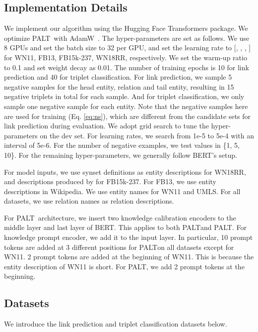 \documentclass[11pt]{article}
\newcommand{\method}{\textsc{PALT}}
\newcommand{\methodLarge}{\method}
\newcommand{\prompt}{knowledge prompt encoder}
\newcommand{\calibration}{knowledge calibration encoder}
\begin{document}
\subsection{Implementation Details}
We implement our algorithm using the Hugging Face Transformers package. We optimize \method\ with AdamW~\cite{loshchilov_decoupled_2018}. The hyper-parameters are set as follows. We use 8 GPUs and set the batch size to 32 per GPU, and set the learning rate to [, , , ] for WN11, FB13, FB15k-237, WN18RR, respectively. We set the warm-up ratio to 0.1 and set weight decay as 0.01. The number of training epochs is 10 for link prediction and 40 for triplet classification. For link prediction, we sample 5 negative samples for the head entity, relation and tail entity, resulting in 15 negative triplets in total for each sample. And for triplet classification, we only sample one negative sample for each entity. Note that the negative samples here are used for training (Eq. \ref{eq:ns}), which are different from the candidate sets for link prediction during evaluation. 
We adopt grid search to tune the hyper-parameters on the dev set. For learning rates, we search from 1e-5 to 5e-4 with an interval of 5e-6. For the number of negative examples, we test values in \{1, 5, 10\}. For the remaining hyper-parameters, we generally follow BERT’s setup. 

For model inputs, we use synset definitions as entity descriptions for WN18RR, and descriptions produced by \citet{KB_NL_3} for FB15k-237. For FB13, we use entity descriptions in Wikipedia. We use entity names for WN11 and UMLS. For all datasets, we use relation names as relation descriptions. 

For \method\ architecture, we insert two \calibration s to the middle layer and last layer of BERT. This applies to both \method and \methodLarge. For \prompt, we add it to the input layer. In particular, 10 prompt tokens are added at 3 different positions for \method on all datasets except for WN11. 2 prompt tokens are added at the beginning of WN11. This is because the entity description of WN11 is short. For \methodLarge, we add 2 prompt tokens at the beginning.

\subsection{Datasets}
We introduce the link prediction and triplet classification datasets below.
\end{document}
